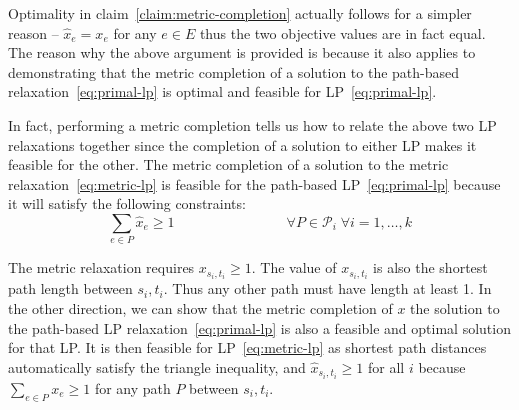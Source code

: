 Optimality in claim~\ref{claim:metric-completion} actually follows for a simpler reason -- $\hat{x}_e = x_e$ for any $e \in E$ thus the two objective values are in fact equal. The reason why the above argument is provided is because it also applies to demonstrating that the metric completion of a solution to the path-based relaxation~\ref{eq:primal-lp} is optimal and feasible for LP~\ref{eq:primal-lp}.

In fact, performing a metric completion tells us how to relate the above two LP relaxations together since the completion of a solution to either LP makes it feasible for the other. The metric completion of a solution to the metric relaxation~\ref{eq:metric-lp} is feasible for the path-based LP~\ref{eq:primal-lp} because it will satisfy the following constraints:
\begin{equation*}
\sum_{e \in P} \hat{x}_e \geq 1
\qquad\qquad\qquad\qquad
\forall P \in \mathcal{P}_i \; \forall i = 1, \ldots, k
\end{equation*}

The metric relaxation requires $x_{s_i, t_i} \geq 1$. The value of $x_{s_i, t_i}$ is also the shortest path length between $s_i, t_i$. Thus any other path must have length at least 1. In the other direction, we can show that the metric completion of $x$ the solution to the path-based LP relaxation~\ref{eq:primal-lp} is also a feasible and optimal solution for that LP. It is then feasible for LP~\ref{eq:metric-lp} as shortest path distances automatically satisfy the triangle inequality, and $\hat{x}_{s_i, t_i} \geq 1$ for all $i$ because $\sum_{e \in P} x_e \geq 1$ for any path $P$ between $s_i, t_i$.
